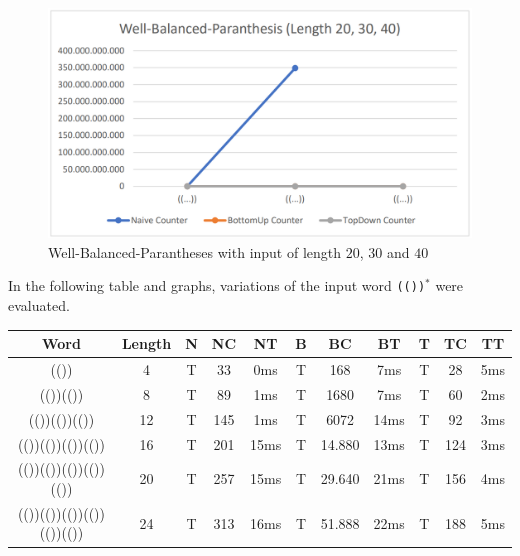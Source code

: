 \documentclass[a4paper, 11pt]{article}
\begin{document}
\begin{figure}[H]
\begin{center}
\includegraphics[scale=0.4]{diagrams/WBP_2.png}
\end{center}
\caption{Well-Balanced-Parantheses with input of length $20$, $30$ and $40$}
\end{figure}

In the following table and graphs, variations of the input word \texttt{(())$^*$} were evaluated.

\begin{small}
\begin{tabular}{|c|c||c|c|c||c|c|c||c|c|c|}
\hline
Word & Length & N & NC & NT & B & BC & BT & T & TC & TT \\
\hline
\hline
(()) & 4 & T & 33 & 0ms & T & 168 & 7ms & T & 28 & 5ms \\
\hline
(())(()) & 8 & T & 89 & 1ms & T & 1680 & 7ms & T & 60 & 2ms \\
\hline
(())(())(()) & 12 & T & 145 & 1ms & T & 6072 & 14ms & T & 92 & 3ms \\
\hline
(())(())(())(()) & 16 & T & 201 & 15ms & T & 14.880 & 13ms & T & 124 & 3ms \\
\hline
(())(())(())(())(()) & 20 & T & 257 & 15ms & T & 29.640 & 21ms & T & 156 & 4ms \\
\hline
(())(())(())(())(())(()) & 24 & T & 313 & 16ms & T & 51.888 & 22ms & T & 188 & 5ms \\
\hline

\end{tabular}
\end{small}
\end{document}
